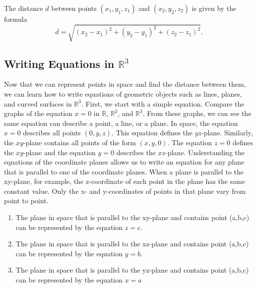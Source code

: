 \documentclass{report}
\begin{document}
    \bigbreak \noindent 
    \bigbreak \noindent 
    \begin{thrmm}
       The distance $d$ between points $(x_1, y_1, z_1)$ and $(x_2, y_2, z_2)$ is given by the formula
       \[
           d = \sqrt{(x_2 - x_1)^2 + (y_2 - y_1)^2 + (z_2 - z_1)^2}.
       \]
    \end{thrmm}

    \bigbreak \noindent 
    \subsection{Writing Equations in $\mathbb{R}^{3}$}
    \bigbreak \noindent 
    Now that we can represent points in space and find the distance between them, we can learn how to write equations of geometric objects such as lines, planes, and curved surfaces in $\mathbb{R}^3$. First, we start with a simple equation. Compare the graphs of the equation $x=0$ in $\mathbb{R}$, $\mathbb{R}^2$, and $\mathbb{R}^3$. From these graphs, we can see the same equation can describe a point, a line, or a plane.
    \bigbreak \noindent 
    \bigbreak \noindent 
    In space, the equation $x=0$ describes all points $(0,y,z)$. This equation defines the $yz$-plane. Similarly, the $xy$-plane contains all points of the form $(x,y,0)$. The equation $z=0$ defines the $xy$-plane and the equation $y=0$ describes the $xz$-plane. 
    \bigbreak \noindent 
    \bigbreak \noindent 
    Understanding the equations of the coordinate planes allows us to write an equation for any plane that is parallel to one of the coordinate planes. When a plane is parallel to the xy-plane, for example, the z-coordinate of each point in the plane has the same constant value. Only the x- and y-coordinates of points in that plane vary from point to point.
    \bigbreak \noindent 
    \begin{thrmm}
        
        \begin{enumerate}
            \item The plane in space that is parallel to the xy-plane and contains point  (a,b,c) can be represented by the equation $z=c$.
            \item The plane in space that is parallel to the xz-plane and contains point  (a,b,c) can be represented by the equation  $y=b$.
            \item The plane in space that is parallel to the yz-plane and contains point  (a,b,c) can be represented by the equation  $x=a$
        \end{enumerate}


    \end{thrmm}
\end{document}
